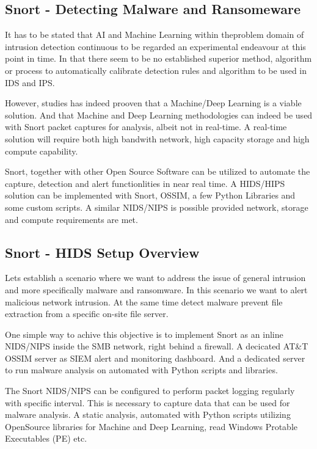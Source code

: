 \subsection{Snort - Detecting Malware and Ransomeware}

It has to be stated that AI and Machine Learning within theproblem domain of intrusion detection continuous to be regarded an experimental\cite{Parisi2019} endeavour at this point in time. In that there seem to be no established superior method, algorithm or process to automatically calibrate detection rules and algorithm to be used in IDS and IPS.

However, studies has indeed prooven that a Machine/Deep Learning is a viable solution. And that Machine and Deep Learning methodologies can indeed be used with Snort packet captures for analysis, albeit not in real-time. A real-time solution will require both high bandwith network, high capacity storage and high compute capability.

Snort, together with other Open Source Software can be utilized to automate the capture, detection and alert functionlities in near real time. A HIDS/HIPS solution can be implemented with Snort, OSSIM, a few Python Libraries and some custom scripts. A similar NIDS/NIPS is possible provided network, storage and compute requirements are met.

\subsection{Snort - HIDS Setup Overview}

Lets establish a scenario where we want to address the issue of general intrusion and more specifically malware and ransomware. In this scenario we want to alert malicious network intrusion. At the same time detect malware prevent file extraction from a specific on-site file server.

One simple way to achive this objective is to implement Snort as an inline NIDS/NIPS inside the SMB network, right behind a firewall. A decicated AT\&T OSSIM server as SIEM alert and monitoring dashboard. And a dedicated server to run malware analysis on automated with Python scripts and libraries.

The Snort NIDS/NIPS can be configured to perform packet logging regularly with specific interval. This is necessary to capture data that can be used for malware analysis. A static analysis, automated with Python scripts utilizing OpenSource libraries for Machine and Deep Learning, read Windows Protable Executables (PE) etc.

